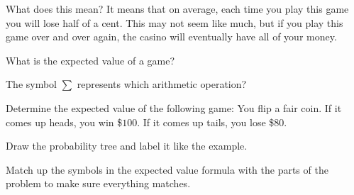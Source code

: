 \documentclass{ximera}
\begin{document}
What does this mean? It means that on average, each time you play this game you will lose half of a cent. This may not seem like much, but if you play this game over and over again, the casino will eventually have all of your money.

\begin{question}
What is the expected value of a game?

    \begin{multipleChoice}
    \end{multipleChoice}

\end{question}

\begin{question}
The symbol $\sum$ represents which arithmetic operation?

    \begin{multipleChoice}
    \end{multipleChoice}

\end{question}

\begin{question}
Determine the expected value of the following game: You flip a fair coin. If it comes up heads, you win \$$100$. If it comes up tails, you lose \$$80$.

    \begin{multipleChoice}
    \end{multipleChoice}
    \begin{hint}
      Draw the probability tree and label it like the example.
    \end{hint}
    \begin{hint}
      Match up the symbols in the expected value formula with the parts of the problem to make sure everything matches.
    \end{hint}

\end{question}
\end{document}
